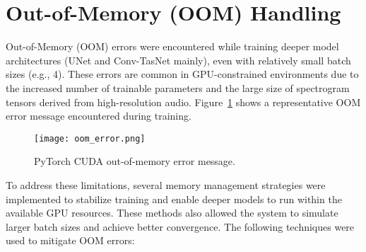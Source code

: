 \section{Out-of-Memory (OOM) Handling}
\label{sec:oom_handling}

Out-of-Memory (OOM) errors were encountered while training deeper model architectures (UNet and Conv-TasNet mainly), even with relatively small batch sizes (e.g., 4). These errors are common in GPU-constrained environments due to the increased number of trainable parameters and the large size of spectrogram tensors derived from high-resolution audio. Figure~\ref{fig:oom_error} shows a representative OOM error message encountered during training.

\begin{figure}[H]
    \centering
    \texttt{[image: oom\_error.png]}
    \caption{\label{fig:oom_error} PyTorch CUDA out-of-memory error message.}
\end{figure}

To address these limitations, several memory management strategies were implemented to stabilize training and enable deeper models to run within the available GPU resources. These methods also allowed the system to simulate larger batch sizes and achieve better convergence. The following techniques were used to mitigate OOM errors:

